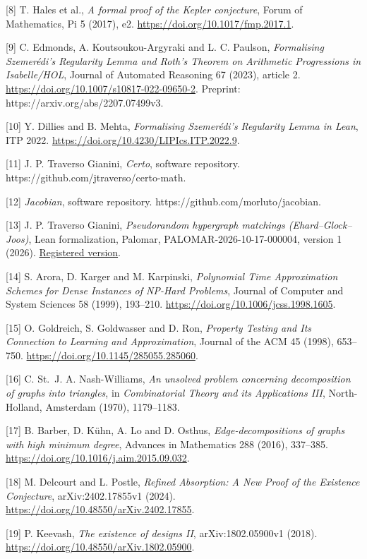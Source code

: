 \documentclass[english,11pt,a4paper]{article}
\begin{document}
{[}8{]} T. Hales et al., \emph{A formal proof of the Kepler conjecture}, Forum of Mathematics, Pi 5 (2017), e2. \url{https://doi.org/10.1017/fmp.2017.1}.

{[}9{]} C. Edmonds, A. Koutsoukou-Argyraki and L. C. Paulson, \emph{Formalising Szemerédi's Regularity Lemma and Roth's Theorem on Arithmetic Progressions in Isabelle/HOL}, Journal of Automated Reasoning 67 (2023), article 2. \url{https://doi.org/10.1007/s10817-022-09650-2}. Preprint: https://arxiv.org/abs/2207.07499v3.

{[}10{]} Y. Dillies and B. Mehta, \emph{Formalising Szemerédi's Regularity Lemma in Lean}, ITP 2022. \url{https://doi.org/10.4230/LIPIcs.ITP.2022.9}.

{[}11{]} J. P. Traverso Gianini, \emph{Certo}, software repository. https://github.com/jtraverso/certo-math.

{[}12{]} \emph{Jacobian}, software repository. https://github.com/morluto/jacobian.

{[}13{]} J. P. Traverso Gianini, \emph{Pseudorandom hypergraph matchings (Ehard--Glock--Joos)}, Lean formalization, Palomar, PALOMAR-2026-10-17-000004, version 1 (2026). \href{https://palomar-registry.org/entry.html?id=PALOMAR-2026-10-17-000004&version=1}{Registered version}.

{[}14{]} S. Arora, D. Karger and M. Karpinski, \emph{Polynomial Time Approximation Schemes for Dense Instances of NP-Hard Problems}, Journal of Computer and System Sciences 58 (1999), 193--210. \url{https://doi.org/10.1006/jcss.1998.1605}.

{[}15{]} O. Goldreich, S. Goldwasser and D. Ron, \emph{Property Testing and Its Connection to Learning and Approximation}, Journal of the ACM 45 (1998), 653--750. \url{https://doi.org/10.1145/285055.285060}.

{[}16{]} C. St.~J. A. Nash-Williams, \emph{An unsolved problem concerning decomposition of graphs into triangles}, in \emph{Combinatorial Theory and its Applications III}, North-Holland, Amsterdam (1970), 1179--1183.

{[}17{]} B. Barber, D. Kühn, A. Lo and D. Osthus, \emph{Edge-decompositions of graphs with high minimum degree}, Advances in Mathematics 288 (2016), 337--385. \url{https://doi.org/10.1016/j.aim.2015.09.032}.

{[}18{]} M. Delcourt and L. Postle, \emph{Refined Absorption: A New Proof of the Existence Conjecture}, arXiv:2402.17855v1 (2024). \url{https://doi.org/10.48550/arXiv.2402.17855}.

{[}19{]} P. Keevash, \emph{The existence of designs II}, arXiv:1802.05900v1 (2018). \url{https://doi.org/10.48550/arXiv.1802.05900}.

\endgroup
\end{document}
